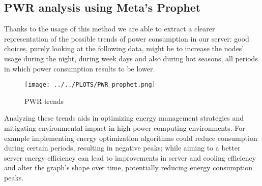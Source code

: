 \subsection{PWR analysis using Meta's Prophet}
Thanks to the usage of this method we are able to extract a clearer representation of the possible trends of power consumption in our server:
good choices, purely looking at the following data, might be to increase the nodes' usage during the night, during week days and also during hot seasons, all periods in which power consumption results to be lower. 

\vspace{-10pt}

\begin{figure}[H]
\centering
\texttt{[image: ../../PLOTS/PWR\_prophet.png]}
\captionsetup{skip=-10pt}
\caption{PWR trends}
\label{fig:PWR_prophet}
\end{figure}

\noindent
Analyzing these trends aids in optimizing energy management strategies and mitigating environmental impact in high-power computing environments.
For example implementing energy optimization algorithms could reduce consumption during certain periods, resulting in negative peaks;
while aiming to a better server energy efficiency can lead to improvements in server and cooling efficiency and alter the graph's shape over time, potentially reducing energy consumption peaks.